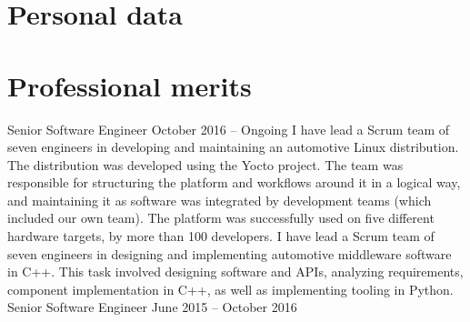\documentclass{twocolcv}
\begin{document}
\section*{Personal data}
\section*{Professional merits}
           {Senior Software Engineer}
           {October 2016 -- Ongoing}
           {
        {I have lead a Scrum team of seven engineers in developing and maintaining an automotive Linux distribution. The distribution was developed using the Yocto project. The team was responsible for structuring the platform and workflows around it in a logical way, and maintaining it as software was integrated by development teams (which included our own team). The platform was successfully used on five different hardware targets, by more than 100 developers.}
\newline\newline
{}
        {I have lead a Scrum team of seven engineers in designing and implementing automotive middleware software in C++. This task involved designing software and APIs, analyzing requirements, component implementation in C++, as well as implementing tooling in Python.
}
}
           {Senior Software Engineer}
           {June 2015 -- October 2016}
\end{document}
